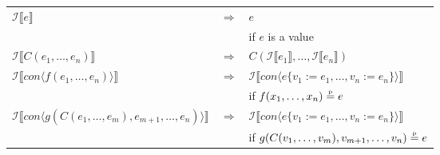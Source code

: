\begin{tabular}{l l l}
$\mathcal{I} \llbracket e \rrbracket$ &
$\Rightarrow$ &
$e$ \\ & & if $e$ is a value\\

$\mathcal{I} \llbracket C(e_1, \ldots, e_n) \rrbracket$ &
$\Rightarrow$ &
$C(\mathcal{I} \llbracket e_1 \rrbracket, \ldots, \mathcal{I} \llbracket e_n \rrbracket)$ \\

$\mathcal{I} \llbracket con \langle f(e_1, \ldots, e_n) \rangle \rrbracket$ &
$\Rightarrow$ &
$\mathcal{I} \llbracket con \langle e \{v_1 := e_1, \ldots, v_n := e_n\} \rangle \rrbracket$ \\
& & if $f(x_1, \ldots, x_n) \stackrel{\textrm{\tiny p}}{=} e$\\

$\mathcal{I} \llbracket con \langle g(C(e_1, \ldots, e_m), e_{m+1},\ldots, e_n)\rangle \rrbracket$ &
$\Rightarrow$ &
$\mathcal{I} \llbracket con \langle e \{v_1 := e_1, \ldots, v_n := e_n\} \rangle \rrbracket$ \\
& & if $g(C(v_1, \ldots, v_m), v_{m+1},\ldots, v_n) \stackrel{\textrm{\tiny p}}{=} e$ 
\end{tabular}